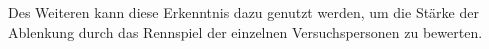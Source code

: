 \documentclass[12pt,a4paper]{scrartcl}
\begin{document}
Des Weiteren kann diese Erkenntnis dazu genutzt werden, um die Stärke der Ablenkung durch das Rennspiel der einzelnen Versuchspersonen zu bewerten. 

\end{document}
